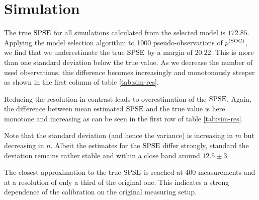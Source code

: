 \section{Simulation}
\label{sec:simulation}
	
	The true $\mathrm{SPSE}$ for all simulations calculated from the selected model is $172.85$. Applying the model selection algorithm to 1000 pseudo-observations of $p^{(\mathrm{SOC})}$, we find that we underestimate the true $\mathrm{SPSE}$ by a margin of $20.22$. 
	This is more than one standard deviation below the true value.
	As we decrease the number of used observations, this difference becomes increasingly and monotonously steeper as shown in the first column of table \ref{tab:sim-res}.
		
	
	
	Reducing the resolution in contrast leads to overestimation of the $\mathrm{SPSE}$.
	Again, the difference between mean estimated $\mathrm{SPSE}$ and the true value is here monotone and increasing as can be seen in the first row of table \ref{tab:sim-res}.
	
	Note that the standard deviation (and hence the variance) is increasing in $m$ but decreasing in $n$.
	Albeit the estimates for the $\mathrm{SPSE}$ differ strongly, standard the deviation remains rather stable and within a close band around $12.5 \pm 3$
	
	The closest approximation to the true $\mathrm{SPSE}$ is reached at 400 measurements and at a resolution of only a third of the original one.
	This indicates a strong dependence of the calibration on the original measuring setup.

